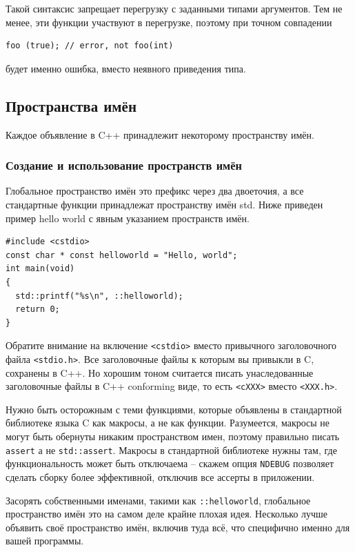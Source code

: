 \documentclass[a4paper,12pt,oneside]{article}
\begin{document}
Такой синтаксис запрещает перегрузку с заданными типами аргументов. Тем не менее, эти функции участвуют в перегрузке, поэтому при точном совпадении

\begin{lstlisting}
foo (true); // error, not foo(int)
\end{lstlisting}

будет именно ошибка, вместо неявного приведения типа.

\pagebreak
\subsection{Пространства имён}\label{Namespaces}

Каждое объявление в C++ принадлежит некоторому пространству имён. 

\subsubsection{Создание и использование пространств имён}

Глобальное пространство имён это префикс через два двоеточия, а все стандартные функции принадлежат пространству имён std. Ниже приведен пример hello world с явным указанием пространств имён.

\begin{lstlisting}
#include <cstdio>
const char * const helloworld = "Hello, world";
int main(void)
{
  std::printf("%s\n", ::helloworld);
  return 0;
}
\end{lstlisting}

Обратите внимание на включение \lstinline!<cstdio>! вместо привычного заголовочного файла \lstinline!<stdio.h>!. Все заголовочные файлы к которым вы привыкли в C, сохранены в C++. Но хорошим тоном считается писать унаследованные заголовочные файлы в C++ conforming виде, то есть \lstinline!<cXXX>! вместо \lstinline!<XXX.h>!.

Нужно быть осторожным с теми функциями, которые объявлены в стандартной библиотеке языка C как макросы, а не как функции. Разумеется, макросы не могут быть обернуты никаким пространством имен, поэтому правильно писать \lstinline!assert! а не \lstinline!std::assert!. Макросы в стандартной библиотеке нужны там, где функциональность может быть отключаема -- скажем опция \lstinline!NDEBUG! позволяет сделать сборку более эффективной, отключив все ассерты в приложении. 

Засорять собственными именами, такими как \lstinline!::helloworld!, глобальное пространство имён это на самом деле крайне плохая идея. Несколько лучше объявить своё пространство имён, включив туда всё, что специфично именно для вашей программы.
\end{document}
